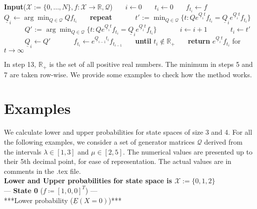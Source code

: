 \documentclass{article}
\newcommand{\statessymbol}{\mathcal{X}}
\newcommand{\stateset}{\statessymbol}
\begin{document}
\begin{algorithmic}[1]
\STATE \textbf{Input}($\stateset:=\{0,\ldots,N\},f:\stateset\to\mathbb{R},\mathcal{Q}$)
\STATE \ \ \  $i \leftarrow 0$
\STATE \ \ \  $t_{i} \leftarrow 0$
\STATE \ \ \  $f_{t_{i}} \leftarrow f$
\STATE \ \ \  $\underline{Q}_{i}\leftarrow \arg\min_{Q\in\mathcal{Q}}Qf_{t_{i}}$
\STATE \ \ \ \textbf{repeat}
  \STATE \ \ \ \ \ \ $t'$ := $\min_{Q\in\mathcal{Q}}\{t:Qe^{\underline{Q}_{i}t}f_{t_{i}}=\underline{Q}_{i}e^{\underline{Q}_{i}t}f_{t_{i}}\}$ 
  \STATE \ \ \ \ \ \ $Q'$ := $\arg\min_{Q\in\mathcal{Q}}\{t:Qe^{\underline{Q}_{i}t}f_{t_{i}}=\underline{Q}_{i}e^{\underline{Q}_{i}t}f_{t_{i}}\}$
  \STATE \ \ \ \ \ \ $i \leftarrow i+1$
  \STATE \ \ \ \ \ \ $t_{i} \leftarrow t'$ 
  \STATE \ \ \ \ \ \ $\underline{Q}_{i} \leftarrow Q'$
  \STATE \ \ \ \ \ \ $f_{t_{i}} \leftarrow e^{\underline{Q}_{i-1}t_{i}}f_{t_{i-1}}$ 
\STATE \ \ \ \textbf{until}  $t_i \not\in \mathbb{R}_{+}$ 
\STATE \ \ \ \textbf{return} $e^{\underline{Q}_{i}t}f_{t_{i}}$ for $t\to\infty$
\newline
\end{algorithmic}
In step 13, $\mathbb{R}_{+}$ is the set of all positive real numbers.
The minimum in steps 5 and 7 are taken row-wise.
We provide some examples to check how the method works.


\section{Examples}

We calculate lower and upper probabilities for state spaces of size 3 and 4.
For all the following examples, we consider a set of generator matrices $\mathcal{Q}$ derived from the intervals $\lambda \in[1,3]$ and $\mu \in [2,5]$.
The numerical values are presented up to their 5th decimal point, for ease of representation. 
The actual values are in comments in the .tex file.\\

\textbf{Lower and Upper probabilities for state space is $\stateset:=\{0,1,2\}$}\\

--- \textbf{State 0} ($f\coloneqq[1,0,0]^T$) ---\\

***Lower probability ($\underline{E}(X=0)$)***\\
\end{document}
